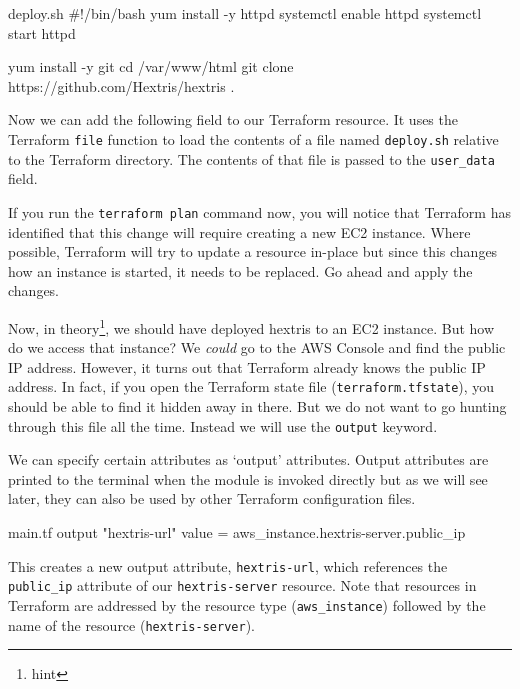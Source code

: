 \documentclass{csse4400}
\begin{document}
\begin{code}[language=bash]{deploy.sh}
#!/bin/bash
yum install -y httpd
systemctl enable httpd
systemctl start httpd

yum install -y git
cd /var/www/html
git clone https://github.com/Hextris/hextris .  
\end{code}



Now we can add the following field to our Terraform resource.
It uses the Terraform \texttt{file} function to load the contents of a file named \texttt{deploy.sh} relative to the Terraform directory.
The contents of that file is passed to the \texttt{user\_data} field.


If you run the \texttt{terraform plan} command now,
you will notice that Terraform has identified that this change will require creating a new EC2 instance.
Where possible, Terraform will try to update a resource in-place but since this changes how an instance is started, it needs to be replaced.
Go ahead and apply the changes.

Now, in theory\footnote{hint}, we should have deployed hextris to an EC2 instance.
But how do we access that instance?
We \textsl{could} go to the AWS Console and find the public IP address.
However, it turns out that Terraform already knows the public IP address.
In fact, if you open the Terraform state file (\texttt{terraform.tfstate}),
you should be able to find it hidden away in there.
But we do not want to go hunting through this file all the time.
Instead we will use the \texttt{output} keyword.

We can specify certain attributes as `output' attributes.
Output attributes are printed to the terminal when the module is invoked directly
but as we will see later, they can also be used by other Terraform configuration files.

\begin{code}[language=terraform]{main.tf}
output "hextris-url" {
  value = aws_instance.hextris-server.public_ip
}
\end{code}

This creates a new output attribute, \texttt{hextris-url},
which references the \texttt{public\_ip} attribute of our \texttt{hextris-server} resource.
Note that resources in Terraform are addressed by the resource type (\texttt{aws\_instance})
followed by the name of the resource (\texttt{hextris-server}).
\end{document}
